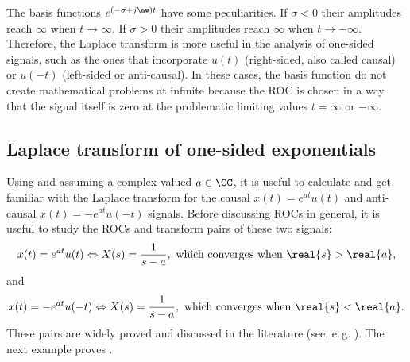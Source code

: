 The basis functions $e^{(-\sigma + j \aw) t}$ have some peculiarities. If $\sigma < 0$ their amplitudes reach $\infty$ when $t \rightarrow \infty$. If $\sigma > 0$ their amplitudes reach $\infty$ when $t \rightarrow -\infty$. Therefore, the Laplace transform is more useful in the analysis of one-sided signals, such as the ones that incorporate $u(t)$ (right-sided, also called causal) or $u(-t)$ (left-sided or anti-causal). In these cases, the basis function do not create mathematical problems at infinite because the ROC is chosen in a way that the signal itself is zero at the problematic limiting values $t=\infty$ or $-\infty$.

\subsection{Laplace transform of one-sided exponentials}
Using  and assuming a complex-valued $a \in \CC$, it is useful to calculate and get familiar with the Laplace transform for the
causal $x(t)=e^{at} u(t)$ and anti-causal $x(t)=-e^{at} u(-t)$ signals. 
Before discussing ROCs in general, it is useful to study the ROCs and transform pairs of these two signals:
\begin{equation}
x(t)=e^{at} u(t) \Leftrightarrow X(s)=\frac{1}{s - a}, \textrm{~which converges when~} \real{s} > \real{a},
\label{eq:laplace_causal}
\end{equation}
and
\begin{equation}
x(t)=-e^{at} u(-t) \Leftrightarrow X(s)=\frac{1}{s - a}, \textrm{~which converges when~} \real{s} < \real{a}.
\label{eq:laplace_anticausal}
\end{equation}
These pairs are widely proved and discussed in the literature (see, e.\,g. ).
The next example proves .


